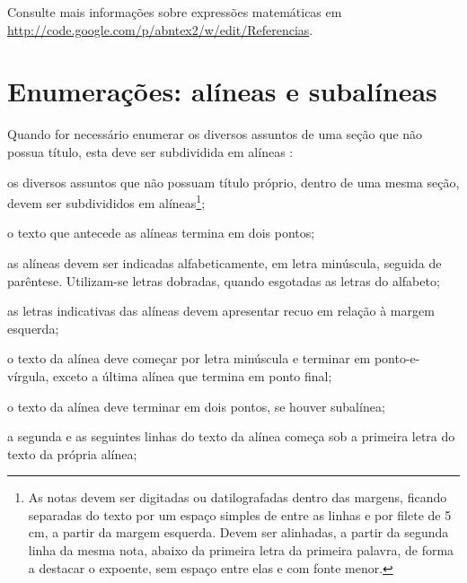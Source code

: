 Consulte mais informações sobre expressões matemáticas em \url{http://code.google.com/p/abntex2/w/edit/Referencias}.


\section{Enumerações: alíneas e subalíneas}

Quando for necessário enumerar os diversos assuntos de uma seção que não possua título, esta deve ser subdividida em alíneas \cite[4.2]{NBR6024:2012}:

\begin{alineas}

  \item os diversos assuntos que não possuam título próprio, dentro de uma mesma
  seção, devem ser subdivididos em alíneas\footnote{As notas devem ser digitadas ou datilografadas
  dentro das margens, ficando separadas do texto por um espaço simples de entre as
  linhas e por filete de 5 cm, a partir da margem esquerda. Devem ser
  alinhadas, a partir da segunda linha da mesma nota, abaixo da primeira letra
  da primeira palavra, de forma a destacar o expoente, sem espaço entre elas e
  com fonte menor. };

  \item o texto que antecede as alíneas termina em dois pontos;
  \item as alíneas devem ser indicadas alfabeticamente, em letra minúscula, seguida de parêntese. Utilizam-se letras dobradas, quando esgotadas as letras do alfabeto;

  \item as letras indicativas das alíneas devem apresentar recuo em relação à
  margem esquerda;

  \item o texto da alínea deve começar por letra minúscula e terminar em
  ponto-e-vírgula, exceto a última alínea que termina em ponto final;

  \item o texto da alínea deve terminar em dois pontos, se houver subalínea;

  \item a segunda e as seguintes linhas do texto da alínea começa sob a
  primeira letra do texto da própria alínea;


\end{alineas}
